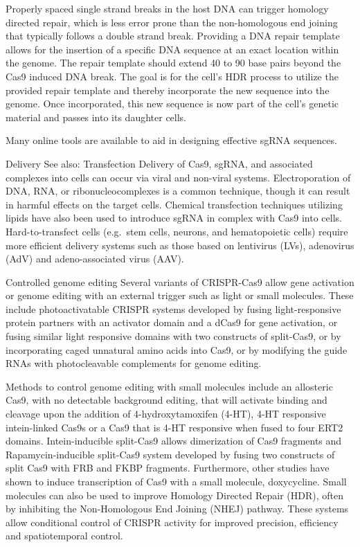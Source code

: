 Properly spaced single strand breaks in the host DNA can trigger homology directed repair, which is less error prone than the non-homologous end joining that typically follows a double strand break. Providing a DNA repair template allows for the insertion of a specific DNA sequence at an exact location within the genome. The repair template should extend 40 to 90 base pairs beyond the Cas9 induced DNA break. The goal is for the cell's HDR process to utilize the provided repair template and thereby incorporate the new sequence into the genome. Once incorporated, this new sequence is now part of the cell's genetic material and passes into its daughter cells.

Many online tools are available to aid in designing effective sgRNA sequences.

Delivery
See also: Transfection
Delivery of Cas9, sgRNA, and associated complexes into cells can occur via viral and non-viral systems. Electroporation of DNA, RNA, or ribonucleocomplexes is a common technique, though it can result in harmful effects on the target cells. Chemical transfection techniques utilizing lipids have also been used to introduce sgRNA in complex with Cas9 into cells. Hard-to-transfect cells (e.g.~stem cells, neurons, and hematopoietic cells) require more efficient delivery systems such as those based on lentivirus (LVs), adenovirus (AdV) and adeno-associated virus (AAV).

Controlled genome editing
Several variants of CRISPR-Cas9 allow gene activation or genome editing with an external trigger such as light or small molecules. These include photoactivatable CRISPR systems developed by fusing light-responsive protein partners with an activator domain and a dCas9 for gene activation, or fusing similar light responsive domains with two constructs of split-Cas9, or by incorporating caged unnatural amino acids into Cas9, or by modifying the guide RNAs with photocleavable complements for genome editing.

Methods to control genome editing with small molecules include an allosteric Cas9, with no detectable background editing, that will activate binding and cleavage upon the addition of 4-hydroxytamoxifen (4-HT), 4-HT responsive intein-linked Cas9s or a Cas9 that is 4-HT responsive when fused to four ERT2 domains. Intein-inducible split-Cas9 allows dimerization of Cas9 fragments and Rapamycin-inducible split-Cas9 system developed by fusing two constructs of split Cas9 with FRB and FKBP fragments. Furthermore, other studies have shown to induce transcription of Cas9 with a small molecule, doxycycline. Small molecules can also be used to improve Homology Directed Repair (HDR), often by inhibiting the Non-Homologous End Joining (NHEJ) pathway. These systems allow conditional control of CRISPR activity for improved precision, efficiency and spatiotemporal control.

